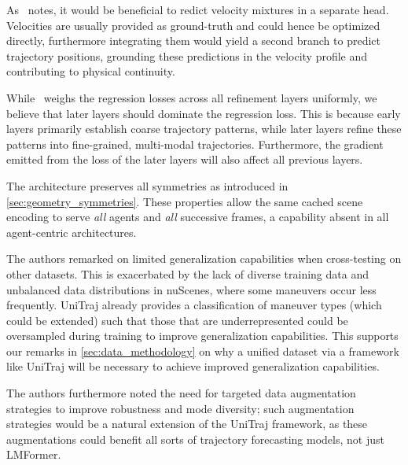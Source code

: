 \begin{description}[itemsep=0.5em]


\item[\textbf{Velocity-Position Decoupling and Optimization}]
As~\cite{lmformerYadav2025} notes, it would be beneficial to redict velocity mixtures in a separate head. Velocities are usually provided as ground-truth and could hence be optimized directly, furthermore integrating them would yield a second branch to predict trajectory positions, grounding these predictions in the velocity profile and contributing to physical continuity.

While~\cite{lmformerYadav2025} weighs the regression losses across all refinement layers uniformly, we believe that later layers should dominate the regression loss. This is because early layers primarily establish coarse trajectory patterns, while later layers refine these patterns into fine-grained, multi-modal trajectories. Furthermore, the gradient emitted from the loss of the later layers will also affect all previous layers.

\item[\textbf{Geometric Symmetries \& Multi-Agent Capabilities}]
The architecture preserves all symmetries as introduced in \autoref{sec:geometry_symmetries}. These properties allow the same cached scene encoding to serve \emph{all} agents and \emph{all} successive frames, a capability absent in all agent-centric architectures.



\item[\textbf{Generalization \& Data Diversity}]
The authors remarked on limited generalization capabilities when cross-testing on other datasets. This is exacerbated by the lack of diverse training data and unbalanced data distributions in nuScenes, where some maneuvers occur less frequently. UniTraj already provides a classification of maneuver types (which could be extended) such that those that are underrepresented could be oversampled during training to improve generalization capabilities. This supports our remarks in \autoref{sec:data_methodology} on why a unified dataset via a framework like UniTraj will be necessary to achieve improved generalization capabilities.

The authors furthermore noted the need for targeted data augmentation strategies to improve robustness and mode diversity; such augmentation strategies would be a natural extension of the UniTraj framework, as these augmentations could benefit all sorts of trajectory forecasting models, not just LMFormer.

\end{description}

